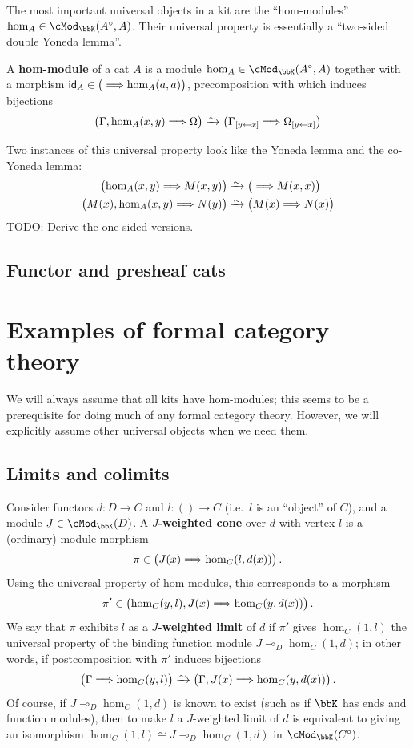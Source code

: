 \documentclass{amsart}
\newcommand{\K}{\bbK}
\let\mod\cMod
\def\modk{\mod_\K}
\def\mor#1{\hom_{#1}}
\renewcommand{\o}{^{\circ}}
\let\vdash\Longrightarrow
\let\mto\vdash    %
\def\mhom#1#2{\left( #1 \vphantom{\big|}\mto #2 \right)}
\newcommand{\subst}[3]{{#1}_{[#2 \mapsfrom #3]}}
\renewcommand{\id}{\mathsf{id}}
\begin{document}
The most important universal objects in a kit are the ``hom-modules'' $\mor A \in \modk(A\o,A)$.
Their universal property is essentially a ``two-sided double Yoneda lemma''.

\begin{defn}
  A \textbf{hom-module} of a cat $A$ is a module $\mor A \in \modk(A\o,A)$ together with a morphism $\id_A \in \mhom{}{\mor A(a,a)}$, precomposition with which induces bijections
  \[ \mhom{\Gamma,\mor A(x,y)}{\Omega} \toiso
  \mhom{\subst\Gamma y x}{\subst\Omega y x}
  \]
\end{defn}

Two instances of this universal property look like the Yoneda lemma and the co-Yoneda lemma:
\begin{align*}
  \mhom{\mor A(x,y)}{M(x,y)} &\toiso \mhom{}{M(x,x)}\\
  \mhom{M(x),\mor A(x,y)}{N(y)} &\toiso \mhom{M(x)}{N(x)}
\end{align*}
TODO: Derive the one-sided versions.


\subsection{Functor and presheaf cats}
\label{sec:func-pshf}


\section{Examples of formal category theory}
\label{sec:examples}

We will always assume that all kits have hom-modules; this seems to be a prerequisite for doing much of any formal category theory.
However, we will explicitly assume other universal objects when we need them.

\subsection{Limits and colimits}

Consider functors $d:D\to C$ and $l:()\to C$ (i.e.\ $l$ is an ``object'' of $C$), and a module $J\in\modk(D)$.
A \textbf{$J$-weighted cone} over $d$ with vertex $l$ is a (ordinary) module morphism
\[ \pi \in \mhom{J(x)}{\mor{C}(l,d(x))}. \]
Using the universal property of hom-modules, this corresponds to a morphism
\[ \pi' \in \mhom{\mor{C}(y,l),J(x)}{\mor{C}(y,d(x))}. \]
We say that $\pi$ exhibits $l$ as a \textbf{$J$-weighted limit} of $d$ if $\pi'$ gives $\mor C(1,l)$ the universal property of the binding function module $J \multimap_D \mor{C}(1,d)$; in other words, if postcomposition with $\pi'$ induces bijections
\[ \mhom{\Gamma}{\mor{C}(y,l)} \toiso \mhom{\Gamma,J(x)}{\mor{C}(y,d(x))}. \]
Of course, if $J \multimap_D \mor{C}(1,d)$ is known to exist (such as if $\K$ has ends and function modules), then to make $l$ a $J$-weighted limit of $d$ is equivalent to giving an isomorphism $\mor{C}(1,l) \cong J \multimap_D \mor{C}(1,d)$ in $\modk(C\o)$.
\end{document}
